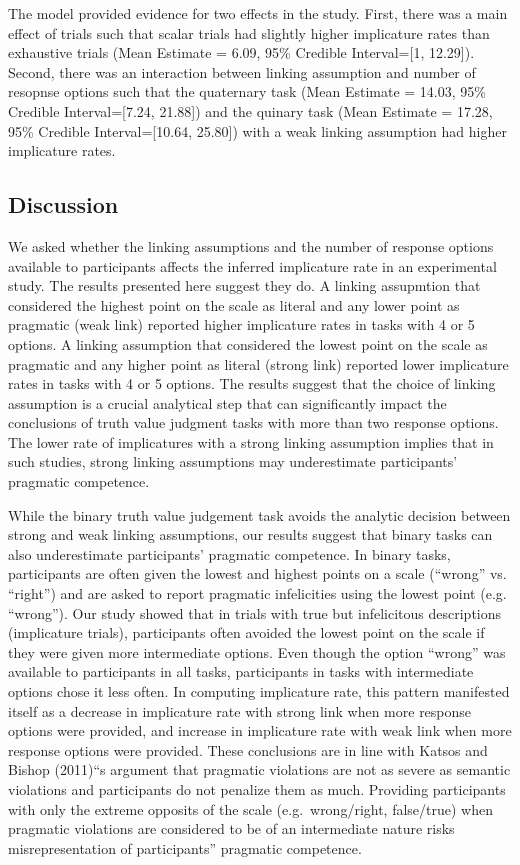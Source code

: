 \documentclass[floatsintext,man]{apa6}
\theoremstyle{definition}
\theoremstyle{definition}
\theoremstyle{definition}
\theoremstyle{remark}
\begin{document}
The model provided evidence for two effects in the study. First, there
was a main effect of trials such that scalar trials had slightly higher
implicature rates than exhaustive trials (Mean Estimate = 6.09, 95\%
Credible Interval={[}1, 12.29{]}). Second, there was an interaction
between linking assumption and number of resopnse options such that the
quaternary task (Mean Estimate = 14.03, 95\% Credible Interval={[}7.24,
21.88{]}) and the quinary task (Mean Estimate = 17.28, 95\% Credible
Interval={[}10.64, 25.80{]}) with a weak linking assumption had higher
implicature rates.

\subsection{Discussion}\label{discussion}

We asked whether the linking assumptions and the number of response
options available to participants affects the inferred implicature rate
in an experimental study. The results presented here suggest they do. A
linking assupmtion that considered the highest point on the scale as
literal and any lower point as pragmatic (weak link) reported higher
implicature rates in tasks with 4 or 5 options. A linking assumption
that considered the lowest point on the scale as pragmatic and any
higher point as literal (strong link) reported lower implicature rates
in tasks with 4 or 5 options. The results suggest that the choice of
linking assumption is a crucial analytical step that can significantly
impact the conclusions of truth value judgment tasks with more than two
response options. The lower rate of implicatures with a strong linking
assumption implies that in such studies, strong linking assumptions may
underestimate participants' pragmatic competence.

While the binary truth value judgement task avoids the analytic decision
between strong and weak linking assumptions, our results suggest that
binary tasks can also underestimate participants' pragmatic competence.
In binary tasks, participants are often given the lowest and highest
points on a scale (\enquote{wrong} vs. \enquote{right}) and are asked to
report pragmatic infelicities using the lowest point (e.g.
\enquote{wrong}). Our study showed that in trials with true but
infelicitous descriptions (implicature trials), participants often
avoided the lowest point on the scale if they were given more
intermediate options. Even though the option \enquote{wrong} was
available to participants in all tasks, participants in tasks with
intermediate options chose it less often. In computing implicature rate,
this pattern manifested itself as a decrease in implicature rate with
strong link when more response options were provided, and increase in
implicature rate with weak link when more response options were
provided. These conclusions are in line with Katsos and Bishop
(2011)\enquote{s argument that pragmatic violations are not as severe as
semantic violations and participants do not penalize them as much.
Providing participants with only the extreme opposits of the scale
(e.g.~wrong/right, false/true) when pragmatic violations are considered
to be of an intermediate nature risks misrepresentation of participants}
pragmatic competence.
\end{document}
